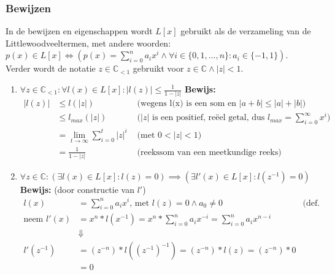 \documentclass{article}
\begin{document}
\subsubsection{Bewijzen}
In de bewijzen en eigenschappen wordt $L[x]$ gebruikt als de verzameling van de Littlewoodveeltermen, met andere woorden: $p(x) \in L[x] \iff (p(x) = \sum_{i=0}^{n}{a_ix^i} \land \forall i \in \{0, 1, ..., n\}: a_i \in \{ -1, 1\})$. Verder wordt de notatie $z \in \mathbb{C}_{<1}$ gebruikt voor $z \in \mathbb{C} \land |z| < 1$.
\begin{enumerate}
\item \underline{$\forall z \in \mathbb{C}_{<1}: \forall l(x) \in L[x]: |l(z)| \leq \frac{1}{1-|z|}$} \newline
\textbf{Bewijs:}
\begin{align*}
|l(z)| &\leq l(|z|) &\text{ (wegens l(x) is een som en } |a+b| \leq |a| + |b| \text{)} \\
&\leq l_{max}(|z|) &\text{ (} |z| \text{ is een positief, re\"eel getal, dus } l_{max} = \sum_{i = 0}^{\infty}{x^i} \text{)} \\
&= \lim_{t \to \infty}{\sum_{i = 0}^{t}{|z|^i}} &\text{ (met } 0 < |z| < 1 \text{)} \\
&= \frac{1}{1-|z|} &\text{ (reekssom van een meetkundige reeks)}
\end{align*}


\item \underline{$\forall z \in \mathbb{C}: (\exists l(x) \in L[x]: l(z) = 0) \implies (\exists l'(x) \in L[x]: l(z^{-1}) = 0)$} \newline
\textbf{Bewijs:} (door constructie van $l'$)
\begin{align*}
l(x) &= \sum_{i = 0}^{n}{a_ix^i} \text{, met } l(z) = 0 \land a_0 \neq 0 &\text{(def. littlewood)} \\
\text{neem } l'(x) &= x^n * l(x^{-1}) = x^n * \sum_{i = 0}^{n}{a_ix^{-i}} = \sum_{i = 0}^{n}{a_ix^{n-i}} \\
&\Downarrow \\
l'(z^{-1}) &= (z^{-n}) * l((z^{-1})^{-1}) = (z^{-n}) * l(z) = (z^{-n}) * 0 \\
&= 0
\end{align*}


\end{enumerate}
\end{document}
